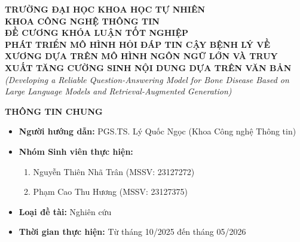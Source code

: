 \documentclass[12pt,a4paper]{article}
\begin{document}

\begin{center}
    \fontsize{13pt}{15pt}\selectfont
    \textbf{TRƯỜNG ĐẠI HỌC KHOA HỌC TỰ NHIÊN} \\
    \textbf{KHOA CÔNG NGHỆ THÔNG TIN} \\[0.8em]
    \fontsize{14pt}{17pt}\selectfont
    \textbf{ĐỀ CƯƠNG KHÓA LUẬN TỐT NGHIỆP} \\[0.8em]
    \fontsize{13.5pt}{16.5pt}\selectfont
    \textbf{PHÁT TRIỂN MÔ HÌNH HỎI ĐÁP TIN CẬY BỆNH LÝ VỀ XƯƠNG DỰA TRÊN MÔ HÌNH NGÔN NGỮ LỚN VÀ TRUY XUẤT TĂNG CƯỜNG SINH NỘI DUNG DỰA TRÊN VĂN BẢN} \\[0.3em]
    \fontsize{12pt}{15pt}\selectfont
    \textit{(Developing a Reliable Question-Answering Model for Bone Disease Based on Large Language Models and Retrieval-Augmented Generation)}
\end{center}

\vspace{0.4em}

\noindent\textbf{THÔNG TIN CHUNG}
\vspace{0.2em}

\begin{itemize}[leftmargin=1.5cm, noitemsep, topsep=0pt]
    \item \textbf{Người hướng dẫn:} PGS.TS. Lý Quốc Ngọc (Khoa Công nghệ Thông tin)
    \item \textbf{Nhóm Sinh viên thực hiện:}
    \begin{enumerate}[leftmargin=0.8cm, label=\arabic*., noitemsep]
        \item Nguyễn Thiên Nhã Trân \hfill (MSSV: 23127272)
        \item Phạm Cao Thu Hương \hfill (MSSV: 23127375)
    \end{enumerate}
    \item \textbf{Loại đề tài:} Nghiên cứu
    \item \textbf{Thời gian thực hiện:} Từ tháng 10/2025 đến tháng 05/2026
\end{itemize}

\vspace{0.4em}
\end{document}
